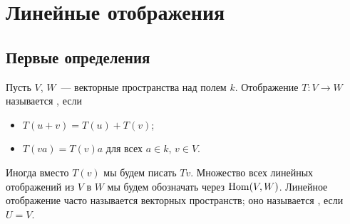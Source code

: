 
\section{Линейные отображения}

\subsection{Первые определения}


\begin{definition}
Пусть $V$, $W$~--- векторные пространства над полем $k$.
Отображение $T\colon V\to W$ называется ,
если
\begin{itemize}
\item $T(u+v)=T(u) + T(v)$;
\item $T(va) = T(v)a$ для всех $a\in k$, $v\in V$.
\end{itemize}
Иногда вместо $T(v)$ мы будем писать $Tv$.
Множество всех линейных отображений из $V$ в $W$ мы будем
обозначать через $\operatorname{Hom}(V,W)$.
Линейное отображение часто называется
 векторных
пространств; оно называется
, если $U=V$.
\end{definition}

